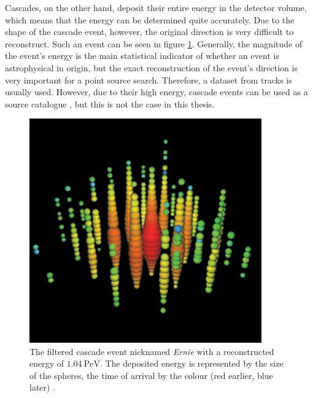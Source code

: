 Cascades, on the other hand, deposit their entire energy in the detector volume, which means that the energy can be determined quite accurately.
Due to the shape of the cascade event, however, the original direction is very difficult to reconstruct.
Such an event can be seen in figure \ref{fig:cascade}.
Generally, the magnitude of the event's energy is the main statistical indicator of whether an event is astrophysical in origin, but the exact reconstruction of the event's direction is very important for a point source search.
Therefore, a dataset from tracks is usually used.
However, due to their high energy, cascade events can be used as a source catalogue \cite{steve_und_mirco}, but this is not the case in this thesis.
\begin{figure}
    \centering
    \includegraphics[width=10cm]{Plots/01_7_icecube/cascade.png}
    \caption{The filtered cascade event nicknamed \textit{Ernie} with a reconstructed energy of $\SI{1.04}{\peta\electronvolt}$. The deposited energy is represented by the size of the spheres, the time of arrival by the colour (red earlier, blue later) \cite{spiering}.}
    \label{fig:cascade}
\end{figure}
